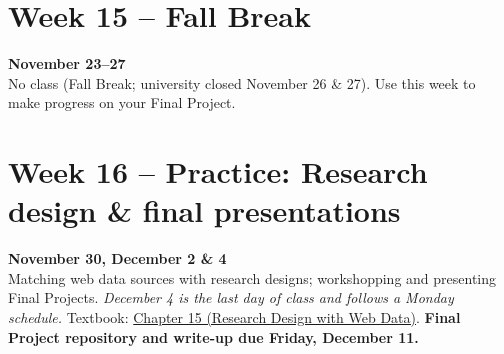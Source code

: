 \documentclass[11pt]{memoir}
\def\bookurl{https://github.com/cuinfoscience/Web-Data-Science-Book}
\begin{document}
\section{Week 15 -- Fall Break}
\textcolor{CUGold}{\textbf{November 23--27}}\\
No class (Fall Break; university closed November 26 \& 27). Use this week to make progress on your Final Project.

\section{Week 16 -- Practice: Research design \& final presentations}
\textcolor{CUGold}{\textbf{November 30, December 2 \& 4}}\\
Matching web data sources with research designs; workshopping and presenting Final Projects. \textit{December 4 is the last day of class and follows a Monday schedule.} Textbook: \href{\bookurl/blob/main/ch-15-research-design.qmd}{Chapter 15 (Research Design with Web Data)}. \textbf{Final Project repository and write-up due Friday, December 11.}



\renewcommand{\bibsection}{\section{\huge \bibname}\prebibhook}
\baselineskip 14.2pt

\end{document}
